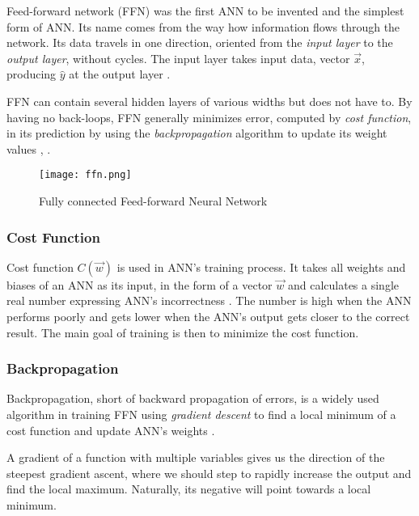 Feed-forward network (FFN) was the first ANN to be invented and the simplest form of ANN. Its name comes from the way how information flows through the network. Its data travels in one direction, oriented from the \textit{input layer} to the \textit{output layer}, without cycles. The input layer takes input data, vector $\vec{x}$, producing $\hat{y}$ at the output layer \cite{ffnbrilliant}.

FFN can contain several hidden layers of various widths but does not have to. By having no back-loops, FFN generally minimizes error, computed by \textit{cost function}, in its prediction by using the \textit{backpropagation} algorithm to update its weight values \cite{mainTypesANN}, \cite{lipton2015critical}.

\begin{figure}[h]
    \centering
    \texttt{[image: ffn.png]}
    \caption{Fully connected Feed-forward Neural Network \cite{matous}}
    \label{fig:ffn}
\end{figure}


\subsubsection{Cost Function}
Cost function $C(\vec{w})$ is used in ANN's training process. It takes all weights and biases of an ANN as its input, in the form of a vector $\vec{w}$ and calculates a single real number expressing ANN's incorrectness \cite{Goodfellow-et-al-2016}. The number is high when the ANN performs poorly and gets lower when the ANN's output gets closer to the correct result. The main goal of training is then to minimize the cost function. 

\subsubsection{Backpropagation}
Backpropagation, short of backward propagation of errors, is a widely used algorithm in training FFN using \textit{gradient descent} to find a local minimum of a cost function and update ANN's weights \cite{birlliantbackprop}.

A gradient of a function with multiple variables gives us the direction of the steepest gradient ascent, where we should step to rapidly increase the output and find the local maximum. Naturally, its negative will point towards a local minimum. 


